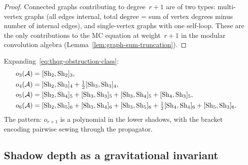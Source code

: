 \begin{proof}
Connected graphs contributing to degree~$r{+}1$ are of two types:
multi-vertex graphs (all edges internal, total degree = sum of
vertex degrees minus number of internal edges), and single-vertex
graphs with one self-loop. These are the only contributions to
the MC equation at weight~$r{+}1$ in the modular convolution
algebra (Lemma~\ref{lem:graph-sum-truncation}).
\end{proof}

\begin{remark}
\label{rem:thqg-first-four}
Expanding~\eqref{eq:thqg-obstruction-class}:
\begin{align}
o_3(\mathcal{A})
 &= [\mathrm{Sh}_2, \mathrm{Sh}_2]_3,
 \label{eq:thqg-o3} \\
o_4(\mathcal{A})
 &= [\mathrm{Sh}_2, \mathrm{Sh}_3]_4
 + \tfrac{1}{2}[\mathrm{Sh}_3, \mathrm{Sh}_3]_4,
 \label{eq:thqg-o4} \\
o_5(\mathcal{A})
 &= [\mathrm{Sh}_2, \mathrm{Sh}_4]_5
 + [\mathrm{Sh}_3, \mathrm{Sh}_3]_5
 + [\mathrm{Sh}_3, \mathrm{Sh}_4]_5
 + [\mathrm{Sh}_4, \mathrm{Sh}_3]_5,
 \label{eq:thqg-o5} \\
o_6(\mathcal{A})
 &= [\mathrm{Sh}_2, \mathrm{Sh}_5]_6
 + [\mathrm{Sh}_3, \mathrm{Sh}_4]_6
 + [\mathrm{Sh}_3, \mathrm{Sh}_5]_6
 + \tfrac{1}{2}[\mathrm{Sh}_4, \mathrm{Sh}_4]_6
 + [\mathrm{Sh}_5, \mathrm{Sh}_3]_6.
 \label{eq:thqg-o6}
\end{align}
The pattern: $o_{r+1}$ is a polynomial in the lower shadows,
with the bracket encoding pairwise sewing through the propagator.
\end{remark}



\subsection{Shadow depth as a gravitational invariant}
\label{subsec:thqg-shadow-depth-grav}

